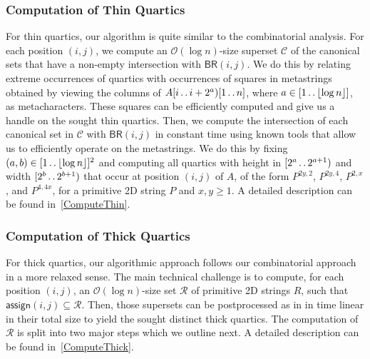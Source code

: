 \documentclass[11pt,letterpaper]{article}
\newcommand{\cO}{\mathcal{O}}
\newcommand{\floor}[1]{\left\lfloor #1 \right\rfloor}
\newcommand{\BR}{\textsf{BR}}
\def\dd{\mathinner{.\,.}}
\newcommand{\assign}{\textsf{assign}}
\begin{document}
\subsubsection*{Computation of Thin Quartics}

For thin quartics, our algorithm is quite similar to the combinatorial analysis.
For each position $(i,j)$, we compute an $\cO(\log n)$-size superset $\mathcal{C}$ of the canonical sets that have a non-empty intersection with $\BR(i,j)$.
We do this by relating extreme occurrences of quartics with occurrences of squares in metastrings obtained by viewing the columns of $A[i \dd i+2^a)[1 \dd n]$, where $a \in [1 \dd \floor{\log n}]$, as metacharacters.
These squares can be efficiently computed and give us a handle on the sought thin quartics.
Then, we compute the intersection of each canonical set in $\mathcal{C}$ with $\BR(i,j)$ in constant time
using known tools that allow us to efficiently operate on the metastrings. We do this by fixing $(a,b) \in [1 \dd \floor{\log n}]^2$ and computing all quartics with height in $[2^a \dd 2^{a+1})$ and width $[2^b \dd 2^{b+1})$ that occur at position $(i,j)$ of $A$, of the form $P^{2y,2}$, $P^{2y,4}$, $P^{2,x}$, and $P^{4,4x}$, for a primitive 2D string $P$ and $x,y\geq 1$.
A detailed description can be found in~\cref{ComputeThin}.

\subsubsection*{Computation of Thick Quartics}

For thick quartics, our algorithmic approach follows our combinatorial approach in a more relaxed sense.
The main technical challenge is to compute, for each position $(i,j)$, an $\cO(\log n)$-size set $\mathcal{R}$ of primitive 2D strings $R$, such that
$\assign(i,j) \subseteq \mathcal{R}$.
Then, those supersets can be postprocessed as in \cite{CRRWZ} in time linear in their total size to yield the sought distinct thick quartics.
The computation of $\mathcal{R}$ is split into two major steps which we outline next. A detailed description can be found in~\cref{ComputeThick}.
\end{document}
